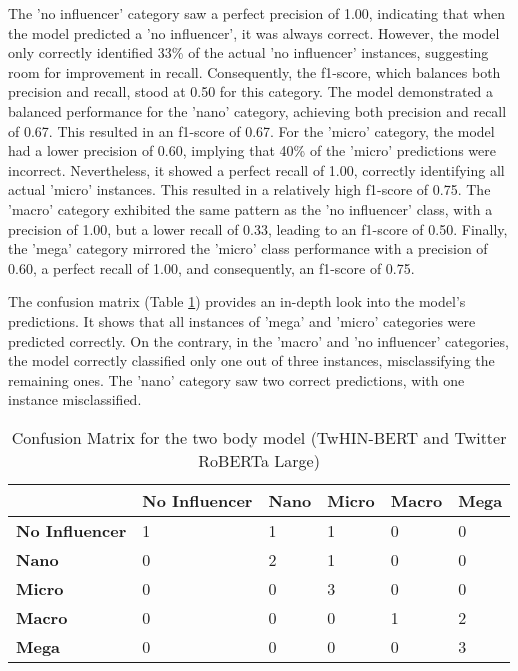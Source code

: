 \documentclass[]{ceurart}
\begin{document}
The 'no influencer' category saw a perfect precision of 1.00, indicating that when the model predicted a 'no influencer', it was always correct. However, the model only correctly identified 33\% of the actual 'no influencer' instances, suggesting room for improvement in recall. Consequently, the f1-score, which balances both precision and recall, stood at 0.50 for this category. The model demonstrated a balanced performance for the 'nano' category, achieving both precision and recall of 0.67. This resulted in an f1-score of 0.67. For the 'micro' category, the model had a lower precision of 0.60, implying that 40\% of the 'micro' predictions were incorrect. Nevertheless, it showed a perfect recall of 1.00, correctly identifying all actual 'micro' instances. This resulted in a relatively high f1-score of 0.75. The 'macro' category exhibited the same pattern as the 'no influencer' class, with a precision of 1.00, but a lower recall of 0.33, leading to an f1-score of 0.50. Finally, the 'mega' category mirrored the 'micro' class performance with a precision of 0.60, a perfect recall of 1.00, and consequently, an f1-score of 0.75.

The confusion matrix (Table \ref{table:5}) provides an in-depth look into the model's predictions. It shows that all instances of 'mega' and 'micro' categories were predicted correctly. On the contrary, in the 'macro' and 'no influencer' categories, the model correctly classified only one out of three instances, misclassifying the remaining ones. The 'nano' category saw two correct predictions, with one instance misclassified.

\begin{table}[ht]
\caption{Confusion Matrix for the two body model (TwHIN-BERT and Twitter RoBERTa Large)}
\centering
\begin{tabular}{llllll}
\hline
\textbf{} & \textbf{No Influencer} & \textbf{Nano} & \textbf{Micro} & \textbf{Macro} & \textbf{Mega}\\ 
\hline
\textbf{No Influencer} & {1} & {1} & {1} & {0} & {0} \\
\textbf{Nano} & {0} & {2} & {1} & {0} & {0} \\
\textbf{Micro} & {0} & {0} & {3} & {0} & {0} \\
\textbf{Macro} & {0} & {0} & {0} & {1} & {2} \\
\textbf{Mega} & {0} & {0} & {0} & {0} & {3} \\
\hline
\end{tabular}
\label{table:5}
\end{table}
\end{document}

